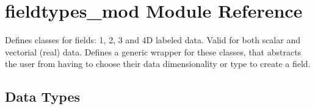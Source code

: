 \hypertarget{namespacefieldtypes__mod}{}\section{fieldtypes\+\_\+mod Module Reference}
\label{namespacefieldtypes__mod}


Defines classes for \textquotesingle{}fields\textquotesingle{}\+: 1, 2, 3 and 4D labeled data. Valid for both scalar and vectorial (real) data. Defines a generic wrapper for these classes, that abstracts the user from having to choose their data dimensionality or type to create a field.  


\subsection*{Data Types}
